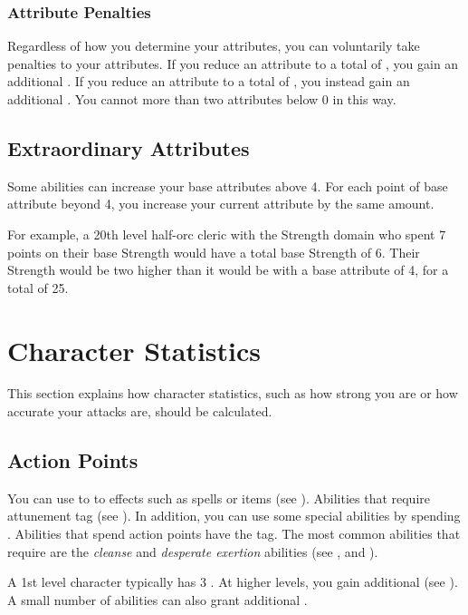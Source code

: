         \subsubsection{Attribute Penalties}
            Regardless of how you determine your attributes, you can voluntarily take penalties to your attributes.
            If you reduce an attribute to a total of , you gain an additional .
            If you reduce an attribute to a total of , you instead gain an additional .
            You cannot more than two attributes below 0 in this way.

    \subsection{Extraordinary Attributes}
        Some abilities can increase your base attributes above 4.
        For each point of base attribute beyond 4, you increase your current attribute by the same amount.

        For example, a 20th level half-orc cleric with the Strength domain who spent 7 points on their base Strength would have a total base Strength of 6.
        Their Strength would be two higher than it would be with a base attribute of 4, for a total of 25.

\section{Character Statistics}
    This section explains how character statistics, such as how strong you are or how accurate your attacks are, should be calculated.

    \subsection{Action Points}\label{Action Points}
        You can use  to  to effects such as spells or items (see ).
        Abilities that require attunement  tag (see ).
        In addition, you can use some special abilities by spending .
        Abilities that spend action points have the  tag.
        The most common abilities that require  are the \textit{cleanse} and \textit{desperate exertion} abilities (see , and ).

        A 1st level character typically has 3 .
        At higher levels, you gain additional  (see ).
        A small number of abilities can also grant additional .

